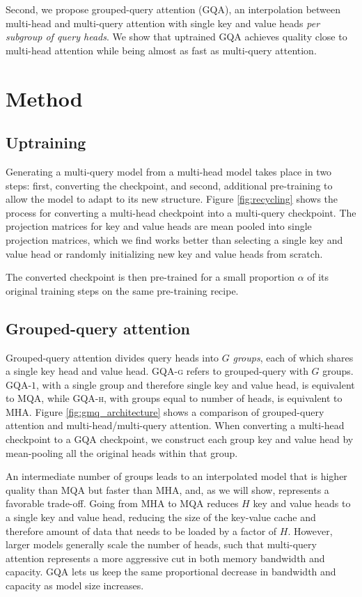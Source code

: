 Second, we propose grouped-query attention (\textsc{GQA}), an interpolation between multi-head and multi-query attention with single key and value heads \emph{per subgroup of query heads}. We show that uptrained \textsc{GQA} achieves quality close to multi-head attention while being almost as fast as multi-query attention.

\section{Method}
\label{section:method}

\subsection{Uptraining}

Generating a multi-query model from a multi-head model takes place in two steps: first, converting the checkpoint, and second, additional pre-training to allow the model to adapt to its new structure. Figure \ref{fig:recycling} shows the process for converting a multi-head checkpoint into a multi-query checkpoint. The projection matrices for key and value heads are mean pooled into single projection matrices, which we find works better than selecting a single key and value head or randomly initializing new key and value heads from scratch.

The converted checkpoint is then pre-trained for a small proportion $\alpha$ of its original training steps on the same pre-training recipe.

\subsection{Grouped-query attention}

Grouped-query attention divides query heads into $G$ \emph{groups}, each of which shares a single key head and value head. \textsc{GQA}-\textsc{g} refers to grouped-query with $G$ groups. \textsc{GQA}-$1$, with a single group and therefore single key and value head, is equivalent to \textsc{MQA}, while \textsc{GQA}-\textsc{h}, with groups equal to number of heads, is equivalent to \textsc{MHA}. Figure \ref{fig:gmq_architecture} shows a comparison of grouped-query attention and multi-head/multi-query attention. When converting a multi-head checkpoint to a \textsc{GQA} checkpoint, we construct each group key and value head by mean-pooling all the original heads within that group.

An intermediate number of groups leads to an interpolated model that is higher quality than \textsc{MQA} but faster than \textsc{MHA}, and, as we will show, represents a favorable trade-off. Going from \textsc{MHA} to \textsc{MQA} reduces $H$ key and value heads to a single key and value head, reducing the size of the key-value cache and therefore amount of data that needs to be loaded by a factor of $H$. However, larger models generally scale the number of heads, such that multi-query attention represents a more aggressive cut in both memory bandwidth and capacity. \textsc{GQA} lets us keep the same proportional decrease in bandwidth and capacity as model size increases.

